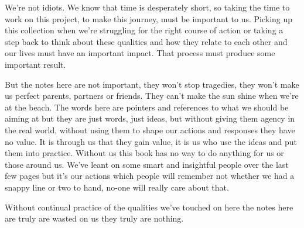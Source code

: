 \cleardoublepage
{ \small

We’re not idiots. We know that time is desperately short, so taking the time to work on this project, to make this journey, must be important to us. Picking up this collection when we’re struggling for the right course of action or taking a step back to think about these qualities and how they relate to each other and our lives must have an important impact. That process must produce some important result. 

But the notes here are not important, they won't stop tragedies, they won't make us perfect parents, partners or friends. They can't make the sun shine when we're at the beach. The words here are pointers and references to what we should be aiming at but they are just words, just ideas, but without giving them agency in the real world, without using them to shape our actions and responses they have no value. It is through us that they gain value, it is us who use the ideas and put them into practice. Without us this book has no way to do anything for us or those around us. We've leant on some smart and insightful people over the last few pages but it's our actions which people will remember not whether we had a snappy line or two to hand, no-one will really care about that.

Without continual practice of the qualities we've touched on here the notes here are truly are wasted on us they truly are nothing. 

}